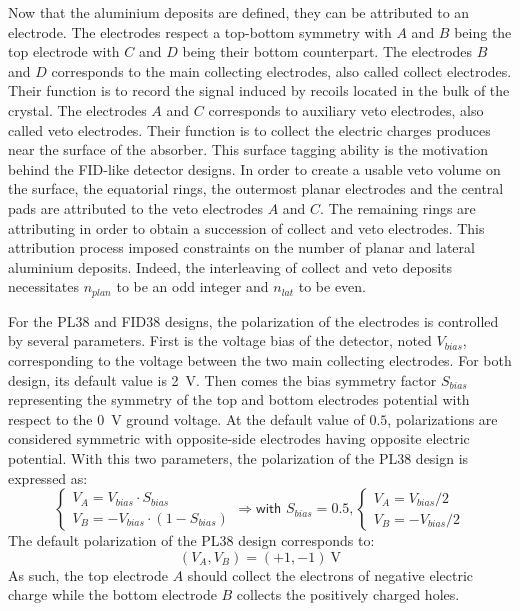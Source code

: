 Now that the aluminium deposits are defined, they can be attributed to an electrode. The electrodes respect a top-bottom symmetry with $A$ and $B$ being the top electrode with $C$ and $D$ being their bottom counterpart. The electrodes $B$ and $D$ corresponds to the main collecting electrodes, also called collect electrodes. Their function is to record the signal induced by recoils located in the bulk of the crystal. The electrodes $A$ and $C$ corresponds to auxiliary veto electrodes, also called veto electrodes. Their function is to collect the electric charges produces near the surface of the absorber. This surface tagging ability is the motivation behind the FID-like detector designs. In order to create a usable veto volume on the surface, the equatorial rings, the outermost planar electrodes and the central pads are attributed to the veto electrodes $A$ and $C$. The remaining rings are attributing in order to obtain a succession of collect and veto electrodes. This attribution process imposed constraints on the number of planar and lateral aluminium deposits. Indeed, the interleaving of collect and veto deposits necessitates $n_{plan}$ to be an odd integer and $n_{lat}$ to be even.

For the PL38 and FID38 designs, the polarization of the electrodes is controlled by several parameters. First is the voltage bias of the detector, noted $V_{bias}$, corresponding to the voltage between the two main collecting electrodes. For both design, its default value is \SI{2}{\volt}. Then comes the bias symmetry factor $S_{bias}$ representing the symmetry of the top and bottom electrodes potential with respect to the \SI{0}{\volt} ground voltage. At the default value of $0.5$, polarizations are considered symmetric with opposite-side electrodes having opposite electric potential.
With this two parameters, the polarization of the PL38 design is expressed as:
\begin{equation}
\label{eq:pl38-polarization}
\begin{cases}
\displaystyle
V_A = V_{bias} \cdot S_{bias}
\\
\displaystyle
V_B = - V_{bias} \cdot (1 - S_{bias})
\end{cases}
\Rightarrow
\textsf{with } S_{bias} = 0.5,
\begin{cases}
\displaystyle
V_A = V_{bias} / 2
\\
\displaystyle
V_B = - V_{bias} / 2 
\end{cases}
\end{equation}
The default polarization of the PL38 design corresponds to:
\begin{equation}
\left( V_A, V_B \right) = (+1, -1) \ \si{\volt}
\end{equation}
As such, the top electrode $A$ should collect the electrons of negative electric charge while the bottom electrode $B$ collects the positively charged holes.


